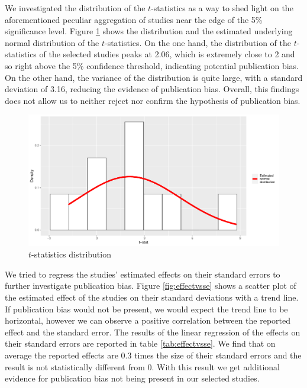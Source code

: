 \documentclass[a4paper, 10pt]{article}
\newcommand\wenjie[1]{\textcolor{purple}{{Wenjie: }{#1}}}
\begin{document}
We investigated the distribution of the $t$-statistics as a way to shed light on the aforementioned peculiar aggregation of studies near the edge of the 5\% significance level. Figure \ref{fig:tstat} shows the distribution and the estimated underlying normal distribution of the $t$-statistics. On the one hand, the distribution of the $t$-statistics of the selected studies peaks at 2.06, which is  extremely close to 2 and so right above the 5\% confidence threshold, indicating potential publication bias. On the other hand, the variance of the distribution is quite large, with a standard deviation of 3.16, reducing the evidence of publication bias. Overall, this findings does not allow us to neither reject nor confirm the hypothesis of publication bias.
\begin{figure}[ht]
    \centering
    \includegraphics[width=16cm]{figures/tstat_distribution.pdf}
    \caption{$t$-statistics distribution}
    \label{fig:tstat}
\end{figure}

We tried to regress the studies' estimated effects on their standard errors to further investigate publication bias. Figure \ref{fig:effectvsse} shows a scatter plot of the estimated effect of the studies on their standard deviations with a trend line. If publication bias would not be present, we would expect the trend line to be horizontal, however we can observe a positive correlation between the reported effect and the standard error. The results of the linear regression of the effects on their standard errors are reported in table \ref{tab:effectvsse}. We find that on average the reported effects are 0.3 times the size of their standard errors and the result is not statistically different from 0. With this result we get additional evidence for publication bias not being present in our selected studies.
\end{document}
